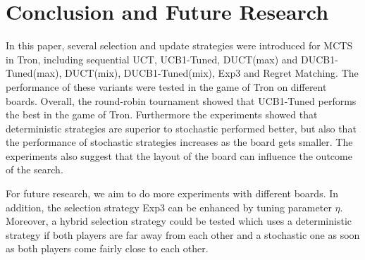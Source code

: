 \documentclass{article}
\begin{document}
\section{Conclusion and Future Research}
\label{sec:conclusion}

In this paper, several selection and update strategies were introduced for MCTS in Tron, including sequential UCT, UCB1-Tuned, DUCT(max) and DUCB1-Tuned(max), DUCT(mix), DUCB1-Tuned(mix), Exp3 and Regret Matching. 
The performance of these variants were tested in the game of Tron on different boards.
Overall, the round-robin tournament showed that UCB1-Tuned performs the best in the game of Tron. 
Furthermore the experiments showed that deterministic strategies are superior to stochastic performed better, 
but also that the performance of stochastic strategies increases as the board gets smaller.
The experiments also suggest that the layout of the board can influence the outcome of the search.

For future research, we aim to do more experiments with different boards. 
In addition, the selection strategy Exp3 can be enhanced by tuning parameter $\eta$.
Moreover, a hybrid selection strategy could be tested which uses a deterministic strategy if both players are far away from each other and a stochastic one as soon as both players come fairly close to each other. 



\end{document}
